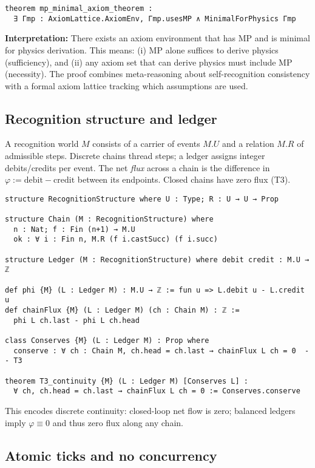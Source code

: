 \documentclass[11pt,a4paper,twoside]{article}
\numberwithin{equation}{section}
\renewcommand{\phi}{\varphi}
\theoremstyle{customthm}
\theoremstyle{customdef}
\theoremstyle{customrem}
\begin{document}
\begin{lstlisting}
theorem mp_minimal_axiom_theorem :
  ∃ Γmp : AxiomLattice.AxiomEnv, Γmp.usesMP ∧ MinimalForPhysics Γmp
\end{lstlisting}

\noindent\textbf{Interpretation:} There exists an axiom environment that has MP and is minimal for physics derivation. This means: (i) MP alone suffices to derive physics (sufficiency), and (ii) any axiom set that can derive physics must include MP (necessity). The proof combines meta-reasoning about self-recognition consistency with a formal axiom lattice tracking which assumptions are used.

\subsection{Recognition structure and ledger}

A recognition world $M$ consists of a carrier of events $M.U$ and a relation $M.R$ of admissible steps. Discrete chains thread steps; a ledger assigns integer debits/credits per event. The net \emph{flux} across a chain is the difference in $\phi:=\mathrm{debit}-\mathrm{credit}$ between its endpoints. Closed chains have zero flux (T3).

\begin{lstlisting}
structure RecognitionStructure where U : Type; R : U → U → Prop

structure Chain (M : RecognitionStructure) where
  n : Nat; f : Fin (n+1) → M.U
  ok : ∀ i : Fin n, M.R (f i.castSucc) (f i.succ)

structure Ledger (M : RecognitionStructure) where debit credit : M.U → ℤ

def phi {M} (L : Ledger M) : M.U → ℤ := fun u => L.debit u - L.credit u
def chainFlux {M} (L : Ledger M) (ch : Chain M) : ℤ :=
  phi L ch.last - phi L ch.head

class Conserves {M} (L : Ledger M) : Prop where
  conserve : ∀ ch : Chain M, ch.head = ch.last → chainFlux L ch = 0  -- T3

theorem T3_continuity {M} (L : Ledger M) [Conserves L] :
  ∀ ch, ch.head = ch.last → chainFlux L ch = 0 := Conserves.conserve
\end{lstlisting}

This encodes discrete continuity: closed-loop net flow is zero; balanced ledgers imply $\phi\equiv 0$ and thus zero flux along any chain.

\subsection{Atomic ticks and no concurrency}
\end{document}
